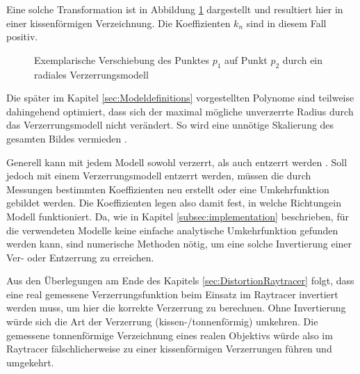 Eine solche Transformation ist in Abbildung \ref{fig:DistExample} dargestellt und resultiert hier in einer kissenförmigen Verzeichnung. Die Koeffizienten $k_n$ sind in diesem Fall positiv.

\begin{figure}[h]
	\centering
	
	\caption{Exemplarische Verschiebung des Punktes $p_1$ auf Punkt $p_2$ durch ein radiales Verzerrungsmodell}
	\label{fig:DistExample}
\end{figure}

Die später im Kapitel \ref{sec:Modeldefinitions} vorgestellten Polynome sind teilweise dahingehend optimiert, dass sich der maximal mögliche unverzerrte Radius durch das Verzerrungsmodell nicht verändert. So wird eine unnötige Skalierung des gesamten Bildes vermieden \cite{ScalePreservingLensDistortion}.

Generell kann mit jedem Modell sowohl verzerrt, als auch entzerrt werden \cite{TangDistortionModels}. Soll jedoch mit einem Verzerrungsmodell entzerrt werden, müssen die durch Messungen bestimmten Koeffizienten neu erstellt oder eine Umkehrfunktion gebildet werden. Die Koeffizienten legen also damit fest, in welche \glqq Richtung\grqq{ }ein Modell funktioniert. Da, wie in Kapitel \ref{subsec:implementation} beschrieben, für die verwendeten Modelle keine einfache analytische Umkehrfunktion gefunden werden kann, sind numerische Methoden nötig, um eine solche Invertierung einer Ver- oder Entzerrung zu erreichen. 

Aus den Überlegungen am Ende des Kapitels \ref{sec:DistortionRaytracer} folgt, dass eine real gemessene Verzerrungsfunktion beim Einsatz im Raytracer invertiert werden muss, um hier die korrekte Verzerrung zu berechnen. Ohne Invertierung würde sich die Art der Verzerrung (kissen-/tonnenförmig) umkehren. Die gemessene tonnenförmige Verzeichnung eines realen Objektivs würde also im Raytracer fälschlicherweise zu einer kissenförmigen Verzerrungen führen und umgekehrt.

